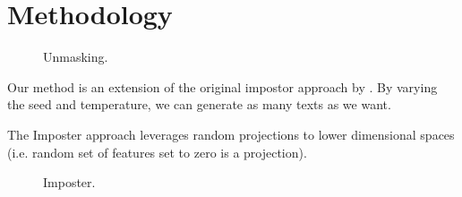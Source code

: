 \chapter{Methodology}
\label{chap:methodology}








\begin{figure}[htbp]
    \centering
    
    \caption{Unmasking.}
    \label{fig:unmasking}
\end{figure}
Our method is an extension of the original impostor approach by \citet{koppel_determining_2014}.
By varying the seed and temperature, we can generate as many texts as we want.
  
    
The Imposter approach leverages random projections to lower dimensional spaces (i.e. random set of features set to zero is a projection).
\begin{figure}[htbp]
    \centering
    
    \caption{Imposter.}
    \label{fig:impostor}
\end{figure}


